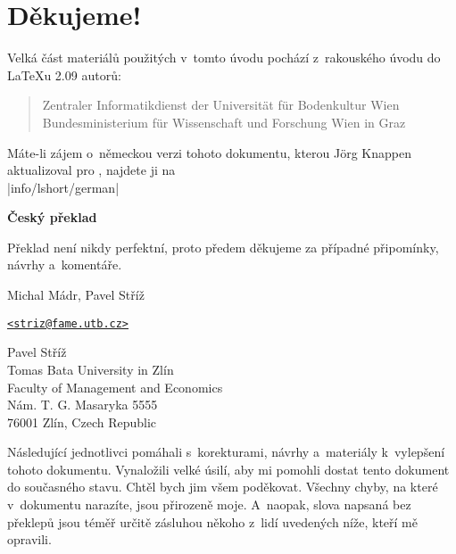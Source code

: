 \chapter{Děkujeme!}
\noindent Velká část materiálů použitých v~tomto úvodu pochází
z~rakouského úvodu do \LaTeX u 2.09 autorů:
\begin{verse}
%
{Zentraler Informatikdienst der Universit\"at f\"ur Bodenkultur Wien}
%
   {Bundesministerium f\"ur Wissenschaft und Forschung Wien}
%
   {in Graz}
\end{verse}

Máte-li zájem o~německou verzi tohoto dokumentu, kterou J\"org Knappen
aktualizoval pro \LaTeXe{}, najdete ji na\\
\CTAN|info/lshort/german|


\begingroup
\parindent=0pt

\textbf{Český překlad}
\medskip

Překlad není nikdy perfektní, proto předem děkujeme za případné připomínky, návrhy a~komentáře. 
\medskip

Michal Mádr, Pavel Stříž\par
\href{mailto:striz@fame.utb.cz}{\texttt{<striz@fame.utb.cz>}}
\medskip

Pavel Stříž\\
Tomas Bata University in Zlín\\
Faculty of Management and Economics\\
Nám. T. G. Masaryka 5555\\
76001 Zlín, Czech Republic
\endgroup


\vspace*{1cm}

\newpage 
\noindent Následující jednotlivci pomáhali s~korekturami,
návrhy a~materiály k~vylepšení tohoto dokumentu. Vynaložili velké
úsilí, aby mi pomohli dostat tento dokument do současného stavu.
Chtěl bych jim všem poděkovat. Všechny chyby, na které v~dokumentu
narazíte, jsou přirozeně moje. A~naopak, slova napsaná
bez překlepů jsou téměř určitě zásluhou někoho z~lidí
uvedených níže, kteří mě opravili.

